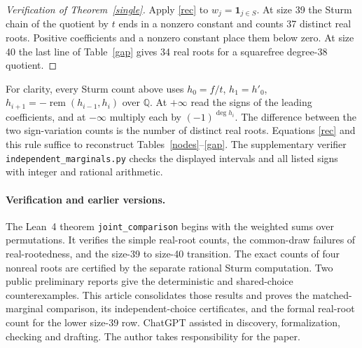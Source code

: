 \documentclass[11pt]{article}
\begin{document}
\begin{proof}[Verification of Theorem~\ref{single}]
Apply \eqref{rec} to $w_j=\mathbf1_{j\in S}$. At size 39 the Sturm chain of the quotient by $t$ ends in a nonzero constant and counts 37 distinct real roots. Positive coefficients and a nonzero constant place them below zero. At size 40 the last line of Table~\ref{gap} gives 34 real roots for a squarefree degree-38 quotient.
\end{proof}

For clarity, every Sturm count above uses $h_0=f/t$, $h_1=h'_0$, $h_{i+1}=-\operatorname{rem}(h_{i-1},h_i)$ over $\mathbb Q$. At $+\infty$ read the signs of the leading coefficients, and at $-\infty$ multiply each by $(-1)^{\deg h_i}$. The difference between the two sign-variation counts is the number of distinct real roots. Equations \eqref{rec} and this rule suffice to reconstruct Tables~\ref{nodes}--\ref{gap}. The supplementary verifier \texttt{independent\_marginals.py} checks the displayed intervals and all listed signs with integer and rational arithmetic.

\paragraph{Verification and earlier versions.}
The Lean~4 theorem \texttt{joint\_comparison} begins with the weighted sums over permutations. It verifies the simple real-root counts, the common-draw failures of real-rootedness, and the size-39 to size-40 transition. The exact counts of four nonreal roots are certified by the separate rational Sturm computation. Two public preliminary reports \cite{z40,zmix} give the deterministic and shared-choice counterexamples. This article consolidates those results and proves the matched-marginal comparison, its independent-choice certificates, and the formal real-root count for the lower size-39 row. ChatGPT assisted in discovery, formalization, checking and drafting. The author takes responsibility for the paper.
\end{document}
